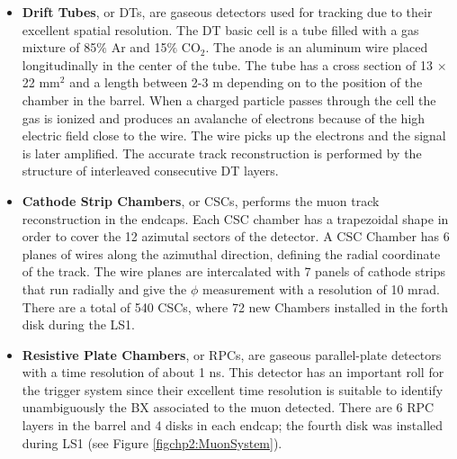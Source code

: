 \begin{itemize} 
 \item \textbf{Drift Tubes}, or DTs, are gaseous detectors used for tracking due to their excellent spatial resolution.
The DT basic cell is a tube filled with a gas mixture of 85$\%$ Ar and 15$\%$ CO$_{2}$.
The anode is an aluminum wire placed longitudinally in the center of the tube.
The tube has a cross section of 13 $\times$ 22 mm$^{2}$ and a length between 2-3 m depending on
to the position of the chamber in the barrel. When a charged particle passes through the cell 
the gas is ionized and produces an avalanche of electrons because of the high 
electric field close to the wire. The wire picks up the electrons and the signal is later amplified. The
accurate track reconstruction is performed by the structure of interleaved consecutive DT layers. 
 \item \textbf{Cathode Strip Chambers}, or CSCs, performs the muon track reconstruction in the endcaps. Each CSC chamber
has a trapezoidal shape in order to cover the 12 azimutal sectors of the detector. A CSC Chamber 
has 6 planes of wires along the azimuthal direction, defining the radial coordinate of the track. The wire
planes are intercalated with 7 panels of cathode strips that run radially and give the $\phi$ measurement 
with a resolution of 10 mrad. There are a total 
of 540 CSCs, where 72 new Chambers installed in the forth disk during the LS1. 
\item \textbf{Resistive Plate Chambers}, or RPCs, are gaseous parallel-plate detectors with a time resolution of about 1 ns.
This detector has an important roll for the trigger system since their excellent time resolution is suitable to
identify unambiguously the BX associated to the muon detected. There are  6 RPC layers in the barrel
and 4 disks in each endcap; the fourth disk was installed during LS1 (see Figure \ref{figchp2:MuonSystem}).
 \end{itemize}


